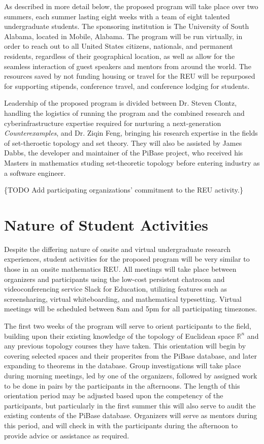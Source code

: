   As described in more detail below, the proposed program will take place
  over two summers, each summer lasting eight weeks
  with a team of eight talented undergraduate
  students. The sponsoring institution is The University of South
  Alabama, located in Mobile, Alabama. The program will be run virtually,
  in order to reach out to all United States citizens, nationals, and
  permanent residents, regardless of their geographical location,
  as well as allow for the seamless interaction of guest speakers and mentors
  from around the world. The resources saved by not funding housing or
  travel for the REU will be repurposed for supporting stipends,
  conference travel, and conference lodging for students.

  Leadership of the proposed program is divided between Dr. Steven Clontz,
  handling the logistics of running the program and the combined
  research and cyberinfrastructure
  expertise required for nurturing a next-generation \textit{Counterexamples},
  and Dr. Ziqin Feng, bringing his research expertise in the fields of set-theroetic
  topology and set theory. They will also be assisted by James Dabbs, the
  developer and maintainer of the PiBase project, who received his Masters
  in mathematics studing set-theoretic topology before entering industry as
  a software engineer.

  \{TODO Add participating organizations'
  commitment to the REU activity.\}

\section{Nature of Student Activities}

  Despite the differing nature of onsite and virtual undergraduate research
  experiences, student activities for the proposed program will be very similar
  to those in an onsite mathematics REU. All meetings will take place
  between organizers and participants using the low-cost persistent chatroom
  and videoconferencing service Slack for Education, utilizing features such
  as screensharing, virtual whiteboarding, and mathematical typesetting.
  Virtual meetings will be scheduled between 8am and 5pm for all
  participating timezones.

  The first two weeks of the program will serve to orient participants
  to the field, building upon their existing knowledge of the topology of
  Euclidean space \(\mathbb R^n\) and any previous topology courses they
  have taken. This orientation will begin by covering selected
  spaces and their properites from the PiBase database,
  and later expanding to theorems in the database. Group investigations will
  take place during morning meetings, led by one of the organizers, followed
  by assigned work to be done in pairs by the participants in the afternoons.
  The length of this orientation period may be adjusted based upon the
  competency of the participants, but particularly in the first summer this
  will also serve to audit the existing contents of the PiBase database.
  Organizers will serve as mentors during this period, and will check in
  with the participants during the afternoon to provide advice or assistance
  as required.


